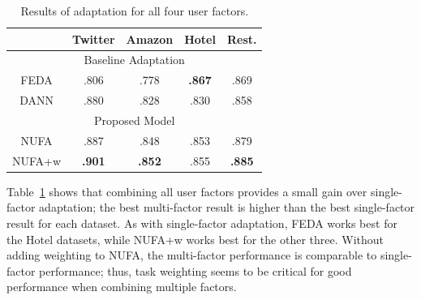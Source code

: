 \begin{table}[t]
\centering
\begin{tabular}{c|c|c|c|c}
 & Twitter & Amazon & Hotel & Rest. \\\hline
\multicolumn{5}{c}{Baseline Adaptation} \\\hline
FEDA & .806 & .778 & \bf .867 & .869 \\\hline
DANN & .880 & .828 & .830 & .858 \\\hline
\multicolumn{5}{c}{Proposed Model} \\\hline
NUFA & .887 & .848 & .853 & .879 \\
NUFA+w & \bf .901 & \bf .852 & .855 & \bf .885 \\
\end{tabular}
\caption{Results of adaptation for all four user factors.}
\label{table:multi}
\end{table}

Table~\ref{table:multi} shows that combining all user factors
provides a small gain over single-factor adaptation;
the best multi-factor result is higher than the best single-factor result for each dataset.
As with single-factor adaptation, FEDA works best for the Hotel datasets,
while NUFA+w works best for the other three.
Without adding weighting to NUFA, the multi-factor performance is comparable to single-factor performance;
thus, task weighting seems to be critical for good performance when combining multiple factors.






